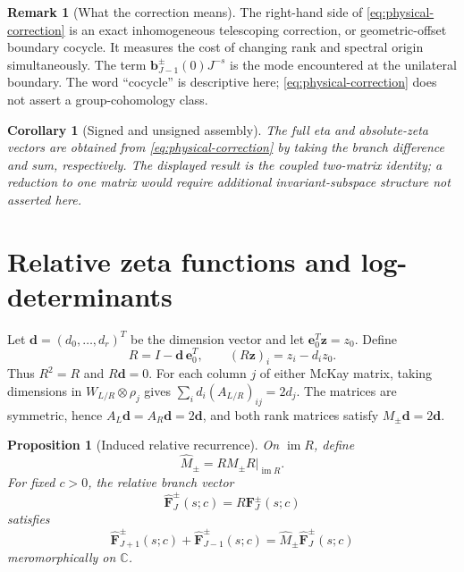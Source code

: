 \documentclass[11pt]{article}
\newtheorem{proposition}[theorem]{Proposition}
\newtheorem{corollary}[theorem]{Corollary}
\theoremstyle{definition}
\newtheorem{remark}[theorem]{Remark}
\newcommand{\C}{\mathbb C}
\begin{document}
\begin{remark}[What the correction means]
\label{rem:cocycle-language}
The right-hand side of \eqref{eq:physical-correction} is an exact
inhomogeneous telescoping correction, or geometric-offset boundary
cocycle.  It measures the cost of changing rank and spectral origin
simultaneously.  The term
$\boldsymbol b_{J-1}^\pm(0)J^{-s}$ is the mode encountered at the
unilateral boundary.  The word ``cocycle'' is descriptive here;
\eqref{eq:physical-correction} does not assert a group-cohomology class.
\end{remark}

\begin{corollary}[Signed and unsigned assembly]
\label{cor:signed-unsigned}
The full eta and absolute-zeta vectors are obtained from
\eqref{eq:physical-correction} by taking the branch difference and
sum, respectively.  The displayed result is the coupled two-matrix
identity; a reduction to one matrix would require additional
invariant-subspace structure not asserted here.
\end{corollary}

\section{Relative zeta functions and log-determinants}

Let $\boldsymbol d=(d_0,\ldots,d_r)^T$ be the dimension vector and let
$\boldsymbol e_0^T\boldsymbol z=z_0$.  Define
\begin{equation}
 R=I-\boldsymbol d\,\boldsymbol e_0^T,
 \qquad
 (R\boldsymbol z)_i=z_i-d_i z_0.
 \label{eq:relative-projection}
\end{equation}
Thus $R^2=R$ and $R\boldsymbol d=0$.  For each column $j$ of either
McKay matrix, taking dimensions in
$W_{L/R}\otimes\rho_j$ gives
$\sum_i d_i(A_{L/R})_{ij}=2d_j$.  The matrices are symmetric, hence
$A_L\boldsymbol d=A_R\boldsymbol d=2\boldsymbol d$, and both rank
matrices satisfy $M_\pm\boldsymbol d=2\boldsymbol d$.

\begin{proposition}[Induced relative recurrence]
\label{prop:relative}
On $\operatorname{im}R$, define
\[
 \widehat M_\pm
 =RM_\pm R|_{\operatorname{im}R}.
\]
For fixed $c>0$, the relative branch vector
\[
 \widehat{\boldsymbol F}_J^\pm(s;c)
 =R\boldsymbol F_J^\pm(s;c)
\]
satisfies
\begin{equation}
 \widehat{\boldsymbol F}_{J+1}^\pm(s;c)
 +\widehat{\boldsymbol F}_{J-1}^\pm(s;c)
 =
 \widehat M_\pm
 \widehat{\boldsymbol F}_J^\pm(s;c)
 \label{eq:relative-recurrence}
\end{equation}
meromorphically on $\C$.
\end{proposition}
\end{document}
